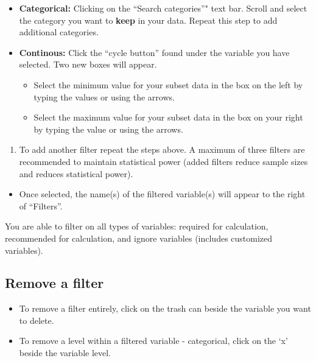 \documentclass[]{book}
\providecommand{\tightlist}{%
  \setlength{\itemsep}{0pt}\setlength{\parskip}{0pt}}
\begin{document}
\begin{itemize}
\item
  \textbf{Categorical:} Clicking on the ``Search categories''" text bar.
  Scroll and select the category you want to \textbf{keep} in your data.
  Repeat this step to add additional categories.
\item
  \textbf{Continous:} Click the ``cycle button'' found under the
  variable you have selected. Two new boxes will appear.

  \begin{itemize}
  \tightlist
  \item
    Select the minimum value for your subset data in the box on the left
    by typing the values or using the arrows.
  \item
    Select the maximum value for your subset data in the box on your
    right by typing the value or using the arrows.
  \end{itemize}
\end{itemize}

\begin{enumerate}
\def\labelenumi{\arabic{enumi}.}
\setcounter{enumi}{3}
\tightlist
\item
  To add another filter repeat the steps above. A maximum of three
  filters are recommended to maintain statistical power (added filters
  reduce sample sizes and reduces statistical power).
\end{enumerate}

\begin{itemize}
\tightlist
\item
  Once selected, the name(s) of the filtered variable(s) will appear to
  the right of ``Filters''.
\end{itemize}

You are able to filter on all types of variables: required for
calculation, recommended for calculation, and ignore variables (includes
customized variables).

\subsection{Remove a filter}\label{remove-a-filter}

\begin{itemize}
\item
  To remove a filter entirely, click on the trash can beside the
  variable you want to delete.
\item
  To remove a level within a filtered variable - categorical, click on
  the `x' beside the variable level.
\end{itemize}
\end{document}
